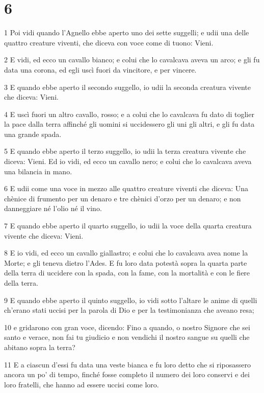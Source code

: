 \chapter{6}

\par 1 Poi vidi quando l'Agnello ebbe aperto uno dei sette suggelli; e udii una delle quattro creature viventi, che diceva con voce come di tuono: Vieni.
\par 2 E vidi, ed ecco un cavallo bianco; e colui che lo cavalcava aveva un arco; e gli fu data una corona, ed egli uscì fuori da vincitore, e per vincere.
\par 3 E quando ebbe aperto il secondo suggello, io udii la seconda creatura vivente che diceva: Vieni.
\par 4 E uscì fuori un altro cavallo, rosso; e a colui che lo cavalcava fu dato di toglier la pace dalla terra affinché gli uomini si uccidessero gli uni gli altri, e gli fu data una grande spada.
\par 5 E quando ebbe aperto il terzo suggello, io udii la terza creatura vivente che diceva: Vieni. Ed io vidi, ed ecco un cavallo nero; e colui che lo cavalcava aveva una bilancia in mano.
\par 6 E udii come una voce in mezzo alle quattro creature viventi che diceva: Una chènice di frumento per un denaro e tre chènici d'orzo per un denaro; e non danneggiare né l'olio né il vino.
\par 7 E quando ebbe aperto il quarto suggello, io udii la voce della quarta creatura vivente che diceva: Vieni.
\par 8 E io vidi, ed ecco un cavallo giallastro; e colui che lo cavalcava avea nome la Morte; e gli teneva dietro l'Ades. E fu loro data potestà sopra la quarta parte della terra di uccidere con la spada, con la fame, con la mortalità e con le fiere della terra.
\par 9 E quando ebbe aperto il quinto suggello, io vidi sotto l'altare le anime di quelli ch'erano stati uccisi per la parola di Dio e per la testimonianza che aveano resa;
\par 10 e gridarono con gran voce, dicendo: Fino a quando, o nostro Signore che sei santo e verace, non fai tu giudicio e non vendichi il nostro sangue su quelli che abitano sopra la terra?
\par 11 E a ciascun d'essi fu data una veste bianca e fu loro detto che si riposassero ancora un po' di tempo, finché fosse completo il numero dei loro conservi e dei loro fratelli, che hanno ad essere uccisi come loro.
